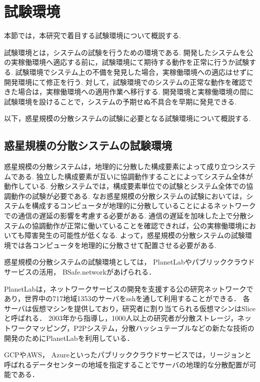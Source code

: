 \section{試験環境}
\label{bg:staging}

本節では，本研究で着目する試験環境について概説する.

試験環境とは，システムの試験を行うための環境である.
開発したシステムを公の実稼働環境へ適応する前に，試験環境にて期待する動作を正常に行うか試験する.
試験環境でシステム上の不備を発見した場合，実稼働環境への適応はせずに開発環境にて修正を行う.
対して，試験環境でのシステムの正常な動作を確認できた場合は，実稼働環境への適用作業へ移行する.
開発環境と実稼働環境の間に試験環境を設けることで，システムの予期せぬ不具合を早期に発見できる.

以下，惑星規模の分散システムの試験に必要となる試験環境について概説する.

\subsection{惑星規模の分散システムの試験環境}
\label{bg:staging:planetary-scale-distributed-system}

惑星規模の分散システムは，地理的に分散した構成要素によって成り立つシステムである.
独立した構成要素が互いに協調動作することによってシステム全体が動作している.
分散システムでは，構成要素単位での試験とシステム全体での協調動作の試験が必要である.
なお惑星規模の分散システムの試験においては，システムを構成するコンピュータが地理的に分散していることによるネットワークでの通信の遅延の影響を考慮する必要がある.
通信の遅延を加味した上で分散システムの協調動作が正常に働いていることを確認できれば，公の実稼働環境においても障害発生の可能性が低くなる.
よって，惑星規模の分散システムの試験環境では各コンピュータを地理的に分散させて配置させる必要がある.

惑星規模の分散システムの試験環境としては， PlanetLabやパブリッククラウドサービスの活用， BSafe.networkがあげられる．

PlanetLabは，ネットワークサービスの開発を支援する公の研究ネットワークであり，世界中の717地域1353のサーバをsshを通して利用することができる．
各サーバは仮想マシンを提供しており，研究者に割り当てられる仮想マシンはSliceと呼ばれる．
2003年から指導し，1000人以上の研究者が分散ストレージ，ネットワークマッピング，P2Pシステム，分散ハッシュテーブルなどの新たな技術の開発のためにPlanetLabを利用している．

GCPやAWS， Azureといったパブリッククラウドサービスでは，リージョンと呼ばれるデータセンターの地域を指定することでサーバの地理的な分散配置が可能である．


